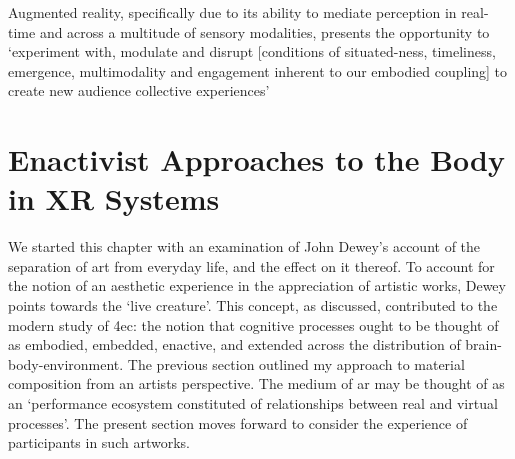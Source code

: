 Augmented reality, specifically due to its ability to mediate perception in real-time and across a multitude of sensory modalities, presents the opportunity to `experiment with, modulate and disrupt [conditions of situated-ness, timeliness, emergence, multimodality and engagement inherent to our embodied coupling] to create new audience collective experiences' \citep[]{chevalier2018}



\section{Enactivist Approaches to the Body in XR Systems}\label{sec: theory-embodiment}
We started this chapter with an examination of John Dewey's account of the separation of art from everyday life, and the effect on it thereof. To account for the notion of an aesthetic experience in the appreciation of artistic works, Dewey points towards the `live creature'. This concept, as discussed, contributed to the modern study of \gls{4ec}: the notion that cognitive processes ought to be thought of as embodied, embedded, enactive, and extended across the distribution of brain-body-environment. The previous section outlined my approach to material composition from an artists perspective. The medium of \gls{ar} may be thought of as an `performance ecosystem constituted of relationships between real and virtual processes'. The present section moves forward to consider the experience of participants in such artworks.

